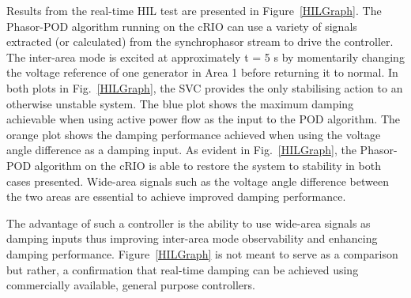 \documentclass[a4paper, 10 pt, conference]{IEEEtran}
\begin{document}
Results from the real-time HIL test are presented in Figure~\ref{HILGraph}. The Phasor-POD algorithm running on the cRIO can use a variety of signals extracted (or calculated) from the synchrophasor stream to drive the controller. The inter-area mode is excited at approximately t = 5 s by momentarily changing the voltage reference of one generator in Area 1 before returning it to normal. In both plots in Fig.~\ref{HILGraph}, the SVC provides the only stabilising action to an otherwise unstable \cite{KundurTwoArea} system. The blue plot shows the maximum damping achievable when using active power flow as the input to the POD algorithm. The orange plot shows the damping performance achieved when using the voltage angle difference as a damping input. As evident in Fig.~\ref{HILGraph}, the Phasor-POD algorithm on the cRIO is able to restore the system to stability in both cases presented. Wide-area signals such as the voltage angle difference between the two areas are essential to achieve improved damping performance.


The advantage of such a controller is the ability to use wide-area signals as damping inputs thus improving inter-area mode observability and enhancing damping performance. Figure~\ref{HILGraph} is not meant to serve as a comparison but rather, a confirmation that real-time damping can be achieved using commercially available, general purpose controllers.\\
\end{document}
